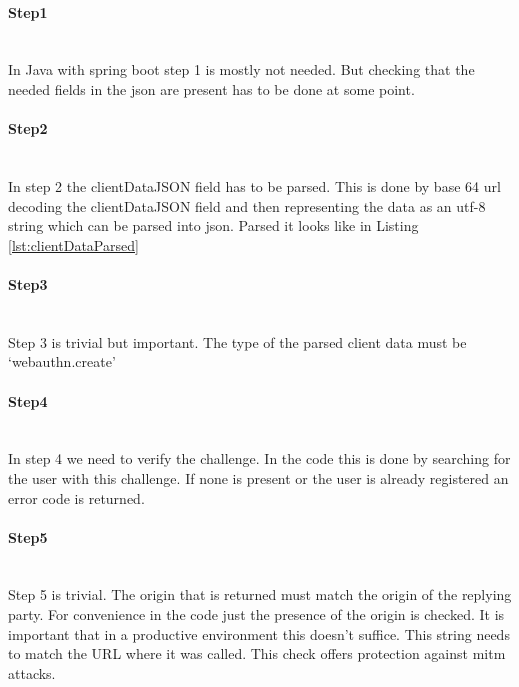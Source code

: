 \documentclass[a4paper, 11pt]{scrartcl}
\begin{document}


\paragraph{Step1} \hfill \\ 
In Java with spring boot step 1 is mostly not needed. But checking that the needed fields in the json are present has to be done at some point.
\paragraph{Step2} \hfill \\ 
In step 2 the clientDataJSON field has to be parsed. This is done by base 64 url decoding the clientDataJSON field and then representing the data as an \gls{utf-8} string which can be parsed into \gls{json}. Parsed it looks like in Listing \ref{lst:clientDataParsed}



\paragraph{Step3}\hfill \\ 
Step 3 is trivial but important. The type of the parsed client data must be `webauthn.create'

\paragraph{Step4}\hfill \\ 
In step 4 we need to verify the challenge. In the code this is done by searching for the user with this challenge. If none is present or the user is already registered an error code is returned.

\paragraph{Step5}\hfill \\ 
Step 5 is trivial. The origin that is returned must match the origin of the replying party. For convenience in the code just the presence of the origin is checked. It is important that in a productive environment this doesn't suffice. This string needs to match the URL where it was called. This check offers protection against \gls{mitm} attacks.
\end{document}

